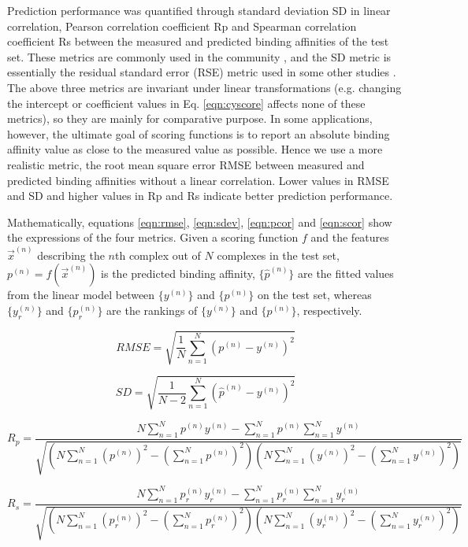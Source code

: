 \documentclass[linenumbers]{bmcart}
\begin{document}
Prediction performance was quantified through standard deviation SD in linear correlation, Pearson correlation coefficient Rp and Spearman correlation coefficient Rs between the measured and predicted binding affinities of the test set. These metrics are commonly used in the community \cite{1313}, and the SD metric is essentially the residual standard error (RSE) metric used in some other studies \cite{963}. The above three metrics are invariant under linear transformations (e.g. changing the intercept or coefficient values in Eq. \ref{eqn:cyscore} affects none of these metrics), so they are mainly for comparative purpose. In some applications, however, the ultimate goal of scoring functions is to report an absolute binding affinity value as close to the measured value as possible. Hence we use a more realistic metric, the root mean square error RMSE between measured and predicted binding affinities without a linear correlation. Lower values in RMSE and SD and higher values in Rp and Rs indicate better prediction performance.

Mathematically, equations \ref{eqn:rmse}, \ref{eqn:sdev}, \ref{eqn:pcor} and \ref{eqn:scor} show the expressions of the four metrics. Given a scoring function $f$ and the features $\overrightarrow{x}^{(n)}$ describing the $n$th complex out of $N$ complexes in the test set, $p^{(n)}=f(\overrightarrow{x}^{(n)})$ is the predicted binding affinity, $\{\hat{p}^{(n)}\}$ are the fitted values from the linear model between $\{y^{(n)}\}$ and $\{p^{(n)}\}$ on the test set, whereas $\{y_r^{(n)}\}$ and $\{p_r^{(n)}\}$ are the rankings of $\{y^{(n)}\}$ and $\{p^{(n)}\}$, respectively.

\begin{equation}
RMSE = \sqrt{\frac{1}{N}\sum_{n=1}^N(p^{(n)}-y^{(n)})^2}
\label{eqn:rmse}
\end{equation}

\begin{equation}
SD = \sqrt{\frac{1}{N-2}\sum_{n=1}^N(\hat{p}^{(n)}-y^{(n)})^2}
\label{eqn:sdev}
\end{equation}

\begin{equation}
R_p = \frac{N\sum_{n=1}^Np^{(n)}y^{(n)}-\sum_{n=1}^Np^{(n)}\sum_{n=1}^Ny^{(n)}}{\sqrt{(N\sum_{n=1}^N(p^{(n)})^2-(\sum_{n=1}^Np^{(n)})^2)(N\sum_{n=1}^N(y^{(n)})^2-(\sum_{n=1}^Ny^{(n)})^2)}}
\label{eqn:pcor}
\end{equation}

\begin{equation}
R_s = \frac{N\sum_{n=1}^Np_r^{(n)}y_r^{(n)}-\sum_{n=1}^Np_r^{(n)}\sum_{n=1}^Ny_r^{(n)}}{\sqrt{(N\sum_{n=1}^N(p_r^{(n)})^2-(\sum_{n=1}^Np_r^{(n)})^2)(N\sum_{n=1}^N(y_r^{(n)})^2-(\sum_{n=1}^Ny_r^{(n)})^2)}}
\label{eqn:scor}
\end{equation}
\end{document}
